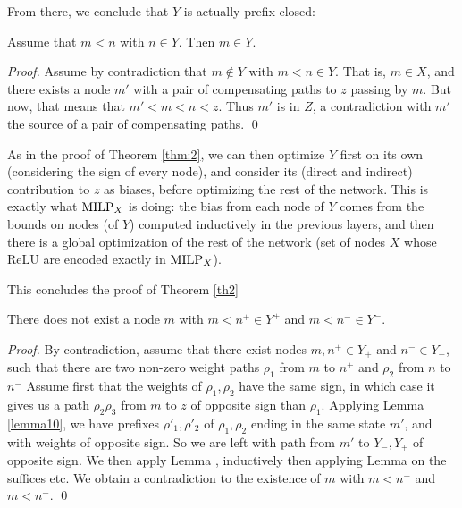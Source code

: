 From there, we conclude that $Y$ is actually prefix-closed:

\begin{lemma}
	\label{lemma12}
	Assume that $m < n$ with $n \in Y$.
	Then $m \in Y$.
\end{lemma}

\begin{proof}
Assume by contradiction that $m \notin Y$ with $m<n \in Y$.
That is, $m \in X$, and there exists a node $m'$ with a pair of compensating paths to $z$
passing by $m$. But now, that means that $m'<m<n<z$.
Thus $m'$ is in $Z$, a contradiction with $m'$ the source of a pair of compensating paths.
\qed
\end{proof}

As in the proof of Theorem \ref{thm:2}, we can then optimize $Y$ first on its own (considering the sign of every node), and consider its (direct and indirect) contribution to $z$ as biases, before optimizing the rest of the network.
This is exactly what ${\textrm{MILP}}_X$ is doing:
the bias from each node of $Y$ comes from the bounds on nodes (of $Y$) computed inductively in the previous layers, and then there is a global optimization of the rest of the network (set of nodes $X$ whose ReLU are encoded exactly in ${\textrm{MILP}}_X$).

This concludes the proof of Theorem \ref{th2}

\iffalse


\begin{lemma}
	There does not exist a node $m$ with $m<n^+ \in Y^+$ and $m<n^- \in Y^-$.
	\end{lemma}
	
	\begin{proof}
	By contradiction, assume that there exist nodes $m, n^+ \in Y_+$ and  $n^
	- \in Y_-$, such that there are two non-zero weight paths $\rho_1$ from $m$ to $n^+$ and $\rho_2$ from $n$ to $n^-$ Assume first that the weights of $\rho_1,\rho_2$ have the same sign, 
	in which case it gives us a path $\rho_2 \rho_3$  from $m$ to $z$ of opposite sign than $\rho_1$. Applying Lemma \ref{lemma10}, we have prefixes $\rho'_1,\rho'_2$ of $\rho_1,\rho_2$ ending in the same state $m'$, and with weights of opposite sign.
	So we are left with path from $m'$ to $Y_-,Y_+$ of opposite sign. 
	We then apply Lemma \label{lemma11}, inductively then applying Lemma \label{lemma10} on the suffices etc. We obtain a contradiction to the existence of $m$ with $m<n^+$ and $m<n^-$. \qed
	\end{proof}
	
